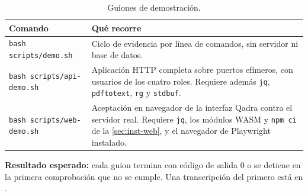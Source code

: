 \begin{table}[H]
  \centering
  \caption{Guiones de demostración.}\label{tab:inst-demo}
  \begin{tabularx}{\textwidth}{L{5.6cm} Y}
    \toprule
    \textbf{Comando} & \textbf{Qué recorre} \\
    \midrule
    \texttt{bash scripts/demo.sh}
      & Ciclo de evidencia por línea de comandos, sin servidor ni base de
        datos. \\
    \texttt{bash scripts/api-demo.sh}
      & Aplicación HTTP completa sobre puertos efímeros, con usuarios de
        los cuatro roles. Requiere además \texttt{jq},
        \texttt{pdftotext}, \texttt{rg} y \texttt{stdbuf}. \\
    \texttt{bash scripts/web-demo.sh}
      & Aceptación en navegador de la interfaz Qadra contra el servidor
        real. Requiere \texttt{jq}, los módulos WASM y \texttt{npm ci}
        de la \cref{sec:inst-web}, y el navegador de Playwright
        instalado. \\
    \bottomrule
  \end{tabularx}
\end{table}

\textbf{Resultado esperado:} cada guion termina con código de salida 0 o
se detiene en la primera comprobación que no se cumple. Una transcripción
del primero está en .
